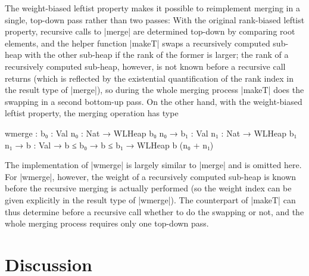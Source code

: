 The weight-biased leftist property makes it possible to reimplement merging in a single, top-down pass rather than two passes:
With the original rank-biased leftist property, recursive calls to |merge| are determined top-down by comparing root elements, and the helper function |makeT| swaps a recursively computed sub-heap with the other sub-heap if the rank of the former is larger; the rank of a recursively computed sub-heap, however, is not known before a recursive call returns (which is reflected by the existential quantification of the rank index in the result type of |merge|), so during the whole merging process |makeT| does the swapping in a second bottom-up pass.
On the other hand, with the weight-biased leftist property, the merging operation has type
\begin{code}
wmerge :  {b₀  : Val} {n₀  : Nat} → WLHeap  b₀  n₀  →
          {b₁  : Val} {n₁  : Nat} → WLHeap  b₁  n₁  →
          {b   : Val} → b ≤ b₀ → b ≤ b₁ → WLHeap b (n₀ + n₁)
\end{code}
The implementation of |wmerge| is largely similar to |merge| and is omitted here.
For |wmerge|, however, the weight of a recursively computed sub-heap is known before the recursive merging is actually performed (so the weight index can be given explicitly in the result type of |wmerge|).
The counterpart of |makeT| can thus determine before a recursive call whether to do the swapping or not, and the whole merging process requires only one top-down pass.


\section{Discussion}

